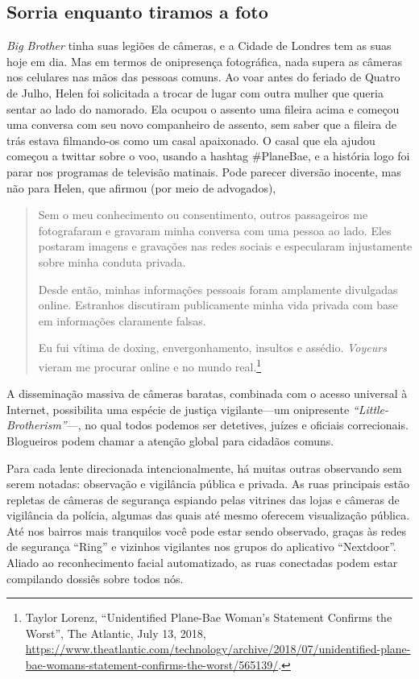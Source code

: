 \documentclass{book}
\newcommand{\ingles}[1]{\textit{#1}}
\begin{document}
\subsection{Sorria enquanto tiramos a foto}
\label{cap3:quem-que-sorria}

\ingles{Big Brother} tinha suas legiões de câmeras, e a Cidade de Londres tem 
as suas hoje em dia. Mas em termos de onipresença fotográfica, nada supera as 
câmeras nos celulares nas mãos das pessoas comuns. Ao voar antes do feriado de 
Quatro de Julho, Helen foi solicitada a trocar de lugar com outra mulher que 
queria sentar ao lado do namorado. Ela ocupou o assento uma fileira acima e começou
uma conversa com seu novo companheiro de assento, sem saber que a fileira de
trás estava filmando-os como um casal apaixonado. O casal que ela ajudou começou
a twittar sobre o voo, usando a hashtag \#PlaneBae, e a história logo foi parar
nos programas de televisão matinais. Pode parecer diversão inocente, mas não para
Helen, que afirmou (por meio de advogados),

\begin{quote}
Sem o meu conhecimento ou consentimento, outros passageiros me fotografaram e
gravaram minha conversa com uma pessoa ao lado. Eles postaram imagens e gravações
nas redes sociais e especularam injustamente sobre minha conduta privada.

Desde então, minhas informações pessoais foram amplamente divulgadas online.
Estranhos discutiram publicamente minha vida privada com base em informações
claramente falsas.

Eu fui vítima de doxing, envergonhamento, insultos e assédio. \ingles{Voyeurs}
vieram me procurar online e no mundo real.\footnote{Taylor Lorenz, ``Unidentified
Plane-Bae Woman’s Statement Confirms the Worst'', The Atlantic, July 13, 2018, 
\url{https://www.theatlantic.com/technology/archive/2018/07/unidentified-plane-bae-womans-statement-confirms-the-worst/565139/}.}
\end{quote}

A disseminação massiva de câmeras baratas, combinada com o acesso universal
à Internet, possibilita uma espécie de justiça vigilante---um onipresente 
\ingles{``Little-Brotherism''}---, no qual todos podemos ser detetives, juízes
e oficiais correcionais. Blogueiros podem chamar a atenção global para cidadãos
comuns.

Para cada lente direcionada intencionalmente, há muitas outras observando sem
serem notadas: observação e vigilância pública e privada. As ruas principais
estão repletas de câmeras de segurança espiando pelas vitrines das lojas e
câmeras de vigilância da polícia, algumas das quais até mesmo oferecem
visualização pública. Até nos bairros mais tranquilos você pode estar sendo
observado, graças às redes de segurança ``Ring'' e vizinhos vigilantes nos
grupos do aplicativo ``Nextdoor''. Aliado ao reconhecimento facial automatizado,
as ruas conectadas podem estar compilando dossiês sobre todos nós.
\end{document}
